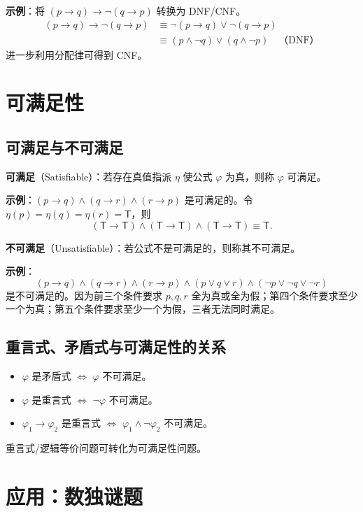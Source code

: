 \documentclass[UTF8,11pt,a4paper]{ctexbook}   %
\theoremstyle{definition}
\begin{document}
\textbf{示例}：将 $(p \to q) \to \neg(q \to p)$ 转换为 DNF/CNF。
\begin{align*}
(p \to q) \to \neg(q \to p) &\equiv \neg(p \to q) \lor \neg(q \to p) \\
&\equiv (p \land \neg q) \lor (q \land \neg p) \quad \text{（DNF）}
\end{align*}
进一步利用分配律可得到 CNF。

\section{可满足性}

\subsection{可满足与不可满足}

\textbf{可满足}（Satisfiable）：若存在真值指派 $\eta$ 使公式 $\varphi$ 为真，则称 $\varphi$ 可满足。

\textbf{示例}：$(p \to q) \land (q \to r) \land (r \to p)$ 是可满足的。令 $\eta(p)=\eta(q)=\eta(r)=\mathsf{T}$，则
\[
(\mathsf{T} \to \mathsf{T}) \land (\mathsf{T} \to \mathsf{T}) \land (\mathsf{T} \to \mathsf{T}) \equiv \mathsf{T}.
\]

\textbf{不可满足}（Unsatisfiable）：若公式不是可满足的，则称其不可满足。

\textbf{示例}：
\[
(p \to q) \land (q \to r) \land (r \to p) \land (p \lor q \lor r) \land (\neg p \lor \neg q \lor \neg r)
\]
是不可满足的。因为前三个条件要求 $p,q,r$ 全为真或全为假；第四个条件要求至少一个为真；第五个条件要求至少一个为假，三者无法同时满足。

\subsection{重言式、矛盾式与可满足性的关系}

\begin{itemize}
    \item $\varphi$ 是矛盾式 $\Leftrightarrow$ $\varphi$ 不可满足。
    \item $\varphi$ 是重言式 $\Leftrightarrow$ $\neg\varphi$ 不可满足。
    \item $\varphi_1 \to \varphi_2$ 是重言式 $\Leftrightarrow$ $\varphi_1 \land \neg\varphi_2$ 不可满足。
\end{itemize}

重言式/逻辑等价问题可转化为可满足性问题。

\section{应用：数独谜题}
\end{document}
